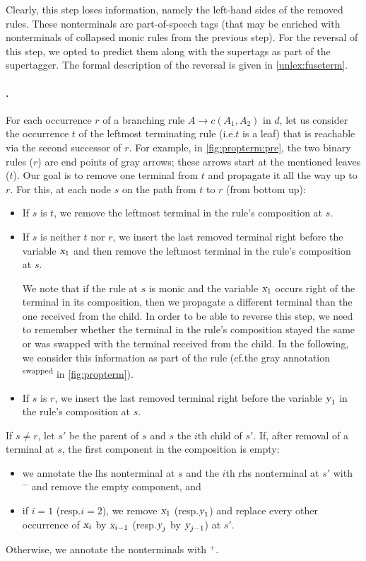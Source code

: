 \documentclass[../document.tex]{subfiles}
\begin{document}
    Clearly, this step loses information, namely the left-hand sides of the removed rules.
    These nonterminals are part-of-speech tags (that may be enriched with nonterminals of collapsed monic rules from the previous step).
    For the reversal of this step, we opted to predict them along with the supertags as part of the supertagger.
    The formal description of the reversal is given in \cref{unlex:fuseterm}.

    \paragraph{.}
    For each occurrence \(r\) of a branching rule $A \to c(A_1, A_2)$ in \(d\), let us consider the occurrence \(t\) of the leftmost terminating rule (i.e.\@ \(t\) is a leaf) that is reachable via the second successor of \(r\).
    For example, in \cref{fig:propterm:pre}, the two binary rules (\(r\)) are end points of gray arrows; these arrows start at the mentioned leaves (\(t\)).
    Our goal is to remove one terminal from $t$ and propagate it all the way up to $r$.
    For this, at each node \(s\) on the path from \(t\) to \(r\) (from bottom up):
    \begin{itemize}[nosep]
        \item If \(s\) is \(t\), we remove the leftmost terminal in the rule's composition at \(s\).
        \item
        If \(s\) is neither \(t\) nor \(r\), we insert the last removed terminal right before the variable \(\textsl{x}_1\) and then remove the leftmost terminal in the rule's composition at \(s\).

        We note that if the rule at $s$ is monic and the variable $\textsl{x}_1$ occurs right of the terminal in its composition, then we propagate a different terminal than the one received from the child.
        In order to be able to reverse this step, we need to remember whether the terminal in the rule's composition stayed the same or was swapped with the terminal received from the child.
        In the following, we consider this information as part of the rule (cf.\@ the gray annotation \textsuperscript{swapped} in \cref{fig:propterm}).
        \item If \(s\) is \(r\), we insert the last removed terminal right before the variable \(\textsl{y}_1\) in the rule's composition at \(s\).
    \end{itemize}
    If \(s \neq r\), let \(s'\) be the parent of $s$ and $s$ the \(i\)th child of $s'$.
    If, after removal of a terminal at \(s\), the first component in the composition is empty:
    \begin{itemize}[noitemsep,topsep=1pt]
        \item we annotate the lhs nonterminal at \(s\) and the \(i\)th rhs nonterminal at \(s'\) with $^-$ and remove the empty component, and
        \item if \(i = 1\) (resp.\@ \(i = 2\)), we remove \(\textsl{x}_1\) (resp.\@ \(\textsl{y}_1\)) and replace every other occurrence of \(\textsl{x}_i\) by \(\textsl{x}_{i-1}\) (resp.\@ \(\textsl{y}_j\) by \(\textsl{y}_{j-1}\)) at $s'$.
    \end{itemize}
    Otherwise, we annotate the nonterminals with \(^+\).
\end{document}
